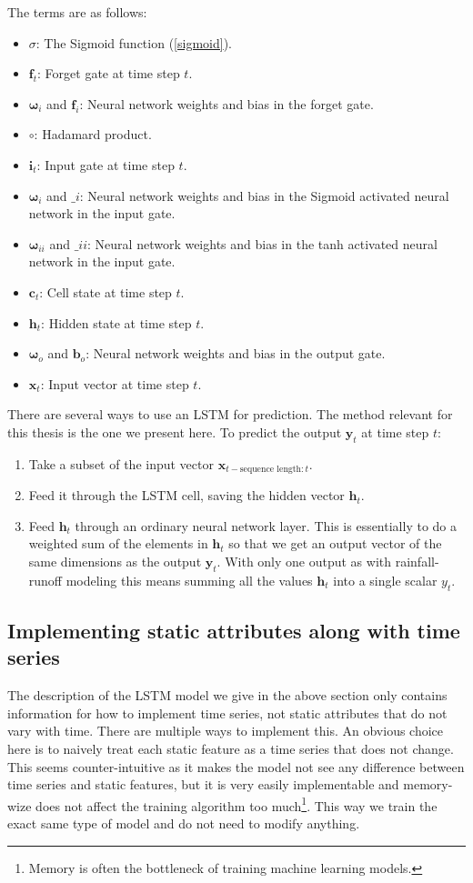 The terms are as follows:
\begin{itemize}
    \item $\sigma$: The Sigmoid function (\ref{sigmoid}).
    \item $\bm{f}_t$: Forget gate at time step $t$.
    \item $\bm{\omega}_i$ and $\bm{f}_i$: Neural network weights and bias in the forget gate.
    \item $\circ$: Hadamard product.
    \item $\bm{i}_t$: Input gate at time step $t$.
    \item $\bm{\omega}_i$ and $\bm_i$: Neural network weights and bias in the Sigmoid activated neural network in the input gate.
    \item $\bm{\omega}_{ii}$ and $\bm_{ii}$: Neural network weights and bias in the tanh activated neural network in the input gate.
    \item $\bm{c}_t$: Cell state at time step $t$.
    \item $\bm{h}_t$: Hidden state at time step $t$.
    \item $\bm{\omega}_o$ and $\bm{b}_o$: Neural network weights and bias in the output gate.
    \item $\bm{x}_t$: Input vector at time step $t$.
\end{itemize}
There are several ways to use an LSTM for prediction. The method relevant for this 
thesis is the one we present here.
To predict the output $\bm{y}_t$ at time step $t$:
\begin{enumerate}
    \item Take a subset of the input vector $\bm{x}_{t-\text{sequence length}:t}$.
    \item Feed it through the LSTM cell, saving the hidden vector $\bm{h}_t$.
    \item Feed $\bm{h}_t$ through an ordinary neural network layer. This is essentially to do a weighted sum of the elements in $\bm{h}_t$ so that we get an output vector of the same dimensions as the output $\bm{y}_t$. With only one output as with rainfall-runoff modeling this means summing all the values $\bm{h}_t$ into a single scalar $y_t$.
\end{enumerate}
\subsection{Implementing static attributes along with time series}
The description of the LSTM model we give in the above section only contains information 
for how to implement time series, not static attributes that do not vary 
with time. There are multiple ways to implement this. An obvious choice here is to 
naively treat each static feature as a time series that does not change. This seems 
counter-intuitive as it makes the model not see any difference between time series and 
static features, but it is very easily implementable and memory-wize does not affect 
the training algorithm too much\footnote{Memory is often the bottleneck of training 
machine learning models.}. 
This way we train the exact same type 
of model and do not need to modify anything.


